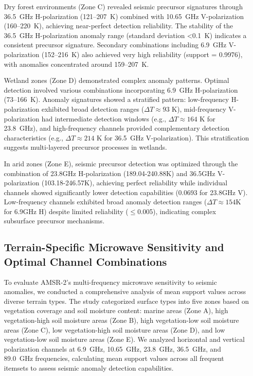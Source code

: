 \documentclass[preprint,review,12pt,authoryear]{elsarticle}
\begin{document}
Dry forest environments (Zone C) revealed seismic precursor signatures through 36.5~GHz H-polarization (121--207~K) combined with 10.65~GHz V-polarization (160--220~K), achieving near-perfect detection reliability. The stability of the 36.5~GHz H-polarization anomaly range (standard deviation <0.1~K) indicates a consistent precursor signature. Secondary combinations including 6.9~GHz V-polarization (152--216~K) also achieved very high reliability (support = 0.9976), with anomalies concentrated around 159--207~K.

Wetland zones (Zone D) demonstrated complex anomaly patterns. Optimal detection involved various combinations incorporating 6.9~GHz H-polarization (73--166~K). Anomaly signatures showed a stratified pattern: low-frequency H-polarization exhibited broad detection ranges ($\Delta T \approx 93$ K), mid-frequency V-polarization had intermediate detection windows (e.g., $\Delta T \approx 164$ K for 23.8~GHz), and high-frequency channels provided complementary detection characteristics (e.g., $\Delta T \approx 214$ K for 36.5~GHz V-polarization). This stratification suggests multi-layered precursor processes in wetlands.

In arid zones (Zone E), seismic precursor detection was optimized through the combination of 23.8GHz H-polarization (189.04-240.88K) and 36.5GHz V-polarization (103.18-246.57K), achieving perfect reliability while individual channels showed significantly lower detection capabilities (0.0693 for 23.8GHz V). Low-frequency channels exhibited broad anomaly detection ranges ($\Delta T \approx 154$K for 6.9GHz H) despite limited reliability ($\le$0.005), indicating complex subsurface precursor mechanisms.

\subsection{Terrain-Specific Microwave Sensitivity and Optimal Channel Combinations}
To evaluate AMSR-2's multi-frequency microwave sensitivity to seismic anomalies, we conducted a comprehensive analysis of mean support values across diverse terrain types. The study categorized surface types into five zones based on vegetation coverage and soil moisture content: marine areas (Zone A), high vegetation-high soil moisture areas (Zone B), high vegetation-low soil moisture areas (Zone C), low vegetation-high soil moisture areas (Zone D), and low vegetation-low soil moisture areas (Zone E). We analyzed horizontal and vertical polarization channels at 6.9~GHz, 10.65~GHz, 23.8~GHz, 36.5~GHz, and 89.0~GHz frequencies, calculating mean support values across all frequent itemsets to assess seismic anomaly detection capabilities.
\end{document}
